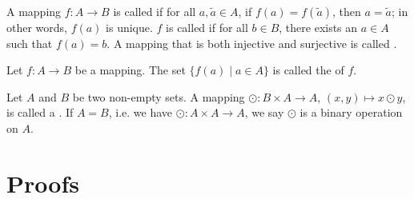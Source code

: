 \begin{defn}
A mapping $ f:A\to B $ is called  if for all $ a,\tilde{a}\in A $, if $ f(a)=f(\tilde{a}) $, then $ a=\tilde{a} $; in other words, $ f(a) $ is unique. $ f $ is called  if for all $ b\in B $, there exists an $ a\in A $ such that $ f(a)=b $. A mapping that is both injective and surjective is called .
\end{defn}

\begin{defn}
Let $ f:A\to B $ be a mapping. The set $ \{f(a)\mid a\in A\} $ is called the  of $ f $.
\end{defn}

\begin{defn}\label{defn:binop}
Let $ A $ and $ B $ be two non-empty sets. A mapping $ \odot:B\times A\to A $, $ (x,y)\mapsto x\odot y $, is called a . If $ A=B $, i.e. we have $ \odot:A\times A\to A $, we say $ \odot $ is a binary operation on $ A $.
\end{defn}

\section{Proofs}